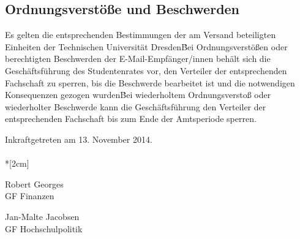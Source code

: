 \begin{multicols}{2}
\section{Ordnungsverstöße und Beschwerden}

\Abs \Satz Es gelten die entsprechenden Bestimmungen der am Versand beteiligten Einheiten der Technischen Universität Dresden\.
Bei Ordnungsverstößen oder berechtigten Beschwerden der E-Mail-Empfänger/innen behält sich die Geschäftsführung des Studentenrates vor, den Verteiler der entsprechenden Fachschaft zu sperren, bis die Beschwerde bearbeitet ist und die notwendigen Konsequenzen gezogen wurden\.
Bei wiederholtem Ordnungsverstoß oder wiederholter Beschwerde kann die Geschäftsführung den Verteiler der entsprechenden Fachschaft bis zum Ende der Amtsperiode sperren.

\end{multicols}

\nopagebreak
\vspace{1cm}

\footnotesize
Inkraftgetreten am 13. November 2014.\\


\normalsize
~\\*[2cm]
\begin{center}
\hspace*{\fill}
\parbox{7cm}{Robert Georges\\GF Finanzen}
\hfill\parbox{7cm}{Jan-Malte Jacobsen \\GF Hochschulpolitik}
\hspace*{\fill}
\end{center}

